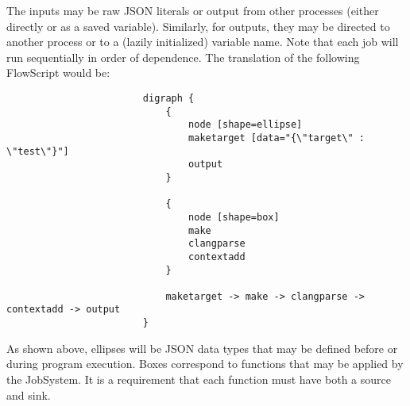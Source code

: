 \documentclass{article}
\begin{document}
				The inputs may be raw JSON literals or output from other processes (either directly or as a saved variable). Similarly, for outputs, they may be directed to another process or to a (lazily initialized) variable name. Note that each job will run sequentially in order of dependence. The translation of the following FlowScript would be:
					\begin{verbatim}
						digraph {
						    {
						        node [shape=ellipse]
						        maketarget [data="{\"target\" : \"test\"}"]
						        output
						    }

						    {
						        node [shape=box]
						        make
						        clangparse
						        contextadd
						    }

						    maketarget -> make -> clangparse -> contextadd -> output
						}
					\end{verbatim}
				As shown above, ellipses will be JSON data types that may be defined before or during program execution. Boxes correspond to functions that may be applied by the JobSystem. It is a requirement that each function must have both a source and sink.
\end{document}
